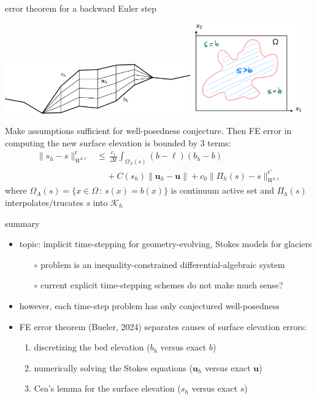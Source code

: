 \documentclass[10pt,dvipsnames]{beamer}
\theoremstyle{theorem}
\newcommand{\bu}{\mathbf{u}}
\newcommand{\cK}{\mathcal{K}}
\newcommand{\rr}{\mathrm{r}}
\begin{document}
\begin{frame}{error theorem for a backward Euler step}

\noindent \mbox{\includegraphics[width=0.6\textwidth]{extruded} \qquad \includegraphics[width=0.35\textwidth]{mapplane}}

\medskip
\begin{theorem}[Bueler, 2024]
Make assumptions sufficient for well-posedness conjecture.  Then FE error in computing the new surface elevation is bounded by 3 terms:
\begin{align*}
\|s_h-s\|_{W^{1,\rr}}^\rr &\le \, \frac{c_1}{\Delta t} \int_{\Omega_A(s)} (b - \ell) (b_h - b) \\
   &\quad\, + C(s_h) \big\|\bu_h - \bu\big\| + c_0 \|\Pi_h(s) - s\|_{W^{1,\rr}}^{\rr'}
\end{align*}
where $\Omega_A(s) = \{x\in\Omega\,:\, s(x)=b(x)\}$ is continuum active set and $\Pi_h(s)$ interpolates/trucates $s$ into $\cK_h$
\end{theorem}
\end{frame}


\begin{frame}{summary}
\begin{itemize}
\item topic: implicit time-stepping for geometry-evolving, Stokes models for glaciers
    \begin{itemize}
    \item[$\circ$] problem is an inequality-constrained differential-algebraic system
    \item[$\circ$] current explicit time-stepping schemes do not make much sense?
    \end{itemize}
\item however, each time-step problem has only conjectured well-posedness
\item FE error theorem (Bueler, 2024) separates causes of surface elevation errors:
    \begin{enumerate}
    \item discretizing the bed elevation ($b_h$ versus exact $b$)
    \item numerically solving the Stokes equations ($\bu_h$ versus exact $\bu$)
    \item Cea's lemma for the surface elevation ($s_h$ versus exact $s$) \strut
    \end{enumerate}
\end{itemize}
\end{frame}
\end{document}
